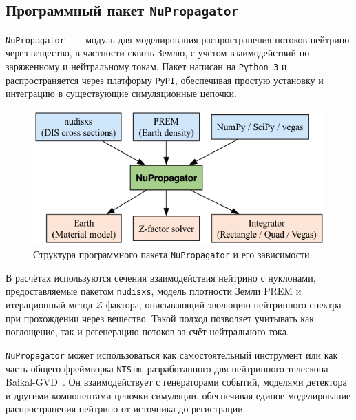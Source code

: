 \subsection{Программный пакет \texttt{NuPropagator}}

\texttt{NuPropagator}~\cite{nupropagator2022} — модуль для моделирования распространения потоков нейтрино через вещество, в частности сквозь Землю, с учётом взаимодействий по заряженному и нейтральному токам. 
Пакет написан на \texttt{Python~3} и распространяется через платформу \texttt{PyPI}, обеспечивая простую установку и интеграцию в существующие симуляционные цепочки.

\begin{figure}[!h]
\centering
\includegraphics[width=\linewidth]{images/nupropagator_diagram.png}
\caption{Структура программного пакета \texttt{NuPropagator} и его зависимости.}
\label{fig:nupropagator1}
\end{figure}

В расчётах используются сечения взаимодействия нейтрино с нуклонами, предоставляемые пакетом \texttt{nudisxs}, модель плотности Земли PREM и итерационный метод $\mathcal{Z}$-фактора, описывающий эволюцию нейтринного спектра при прохождении через вещество. 
Такой подход позволяет учитывать как поглощение, так и регенерацию потоков за счёт нейтрального тока.

\texttt{NuPropagator} может использоваться как самостоятельный инструмент или как часть общего фреймворка \texttt{NTSim}, разработанного для нейтринного телескопа Baikal-GVD~\cite{ntsim2025}. 
Он взаимодействует с генераторами событий, моделями детектора и другими компонентами цепочки симуляции, обеспечивая единое моделирование распространения нейтрино от источника до регистрации.
